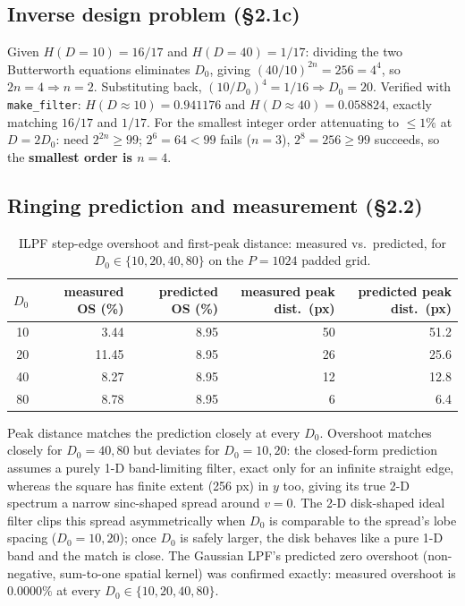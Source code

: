 \documentclass[11pt]{article}
\begin{document}
\subsection{Inverse design problem (\S2.1c)}

Given $H(D{=}10)=16/17$ and $H(D{=}40)=1/17$: dividing the two Butterworth equations eliminates
$D_0$, giving $(40/10)^{2n}=256=4^4$, so $2n=4\Rightarrow n=2$. Substituting back,
$(10/D_0)^4=1/16\Rightarrow D_0=20$. Verified with \texttt{make\_filter}:
$H(D{\approx}10)=0.941176$ and $H(D{\approx}40)=0.058824$, exactly matching $16/17$ and $1/17$.
For the smallest integer order attenuating to $\le1\%$ at $D=2D_0$: need $2^{2n}\ge99$; $2^6=64<99$
fails ($n=3$), $2^8=256\ge99$ succeeds, so the \textbf{smallest order is $n=4$}.

\subsection{Ringing prediction and measurement (\S2.2)}

\begin{table}[H]
\centering
\begin{tabular}{@{}rrrrr@{}}
\toprule
$D_0$ & measured OS (\%) & predicted OS (\%) & measured peak dist.\ (px) & predicted peak dist.\ (px) \\
\midrule
10 & 3.44  & 8.95 & 50 & 51.2 \\
20 & 11.45 & 8.95 & 26 & 25.6 \\
40 & 8.27  & 8.95 & 12 & 12.8 \\
80 & 8.78  & 8.95 & 6  & 6.4  \\
\bottomrule
\end{tabular}
\caption{ILPF step-edge overshoot and first-peak distance: measured vs.\ predicted, for
$D_0\in\{10,20,40,80\}$ on the $P=1024$ padded grid.}
\label{tab:ringing-ilpf}
\end{table}

Peak distance matches the prediction closely at every $D_0$. Overshoot matches closely for
$D_0=40,80$ but deviates for $D_0=10,20$: the closed-form prediction assumes a purely 1-D
band-limiting filter, exact only for an infinite straight edge, whereas the square has finite
extent (256 px) in $y$ too, giving its true 2-D spectrum a narrow sinc-shaped spread around $v=0$.
The 2-D disk-shaped ideal filter clips this spread asymmetrically when $D_0$ is comparable to the
spread's lobe spacing ($D_0=10,20$); once $D_0$ is safely larger, the disk behaves like a pure 1-D
band and the match is close. The Gaussian LPF's predicted zero overshoot (non-negative, sum-to-one
spatial kernel) was confirmed exactly: measured overshoot is $0.0000\%$ at every $D_0\in
\{10,20,40,80\}$.
\end{document}

